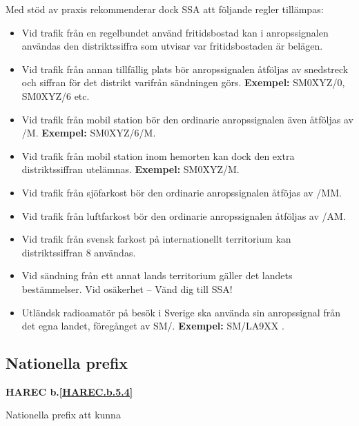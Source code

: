 Med stöd av praxis rekommenderar dock SSA att följande regler tillämpas:

\begin{itemize}
\item Vid trafik från en regelbundet använd fritidsbostad kan i
  anropssignalen användas den distriktssiffra som utvisar var
  fritidsbostaden är belägen.

\item Vid trafik från annan tillfällig plats bör anropssignalen
  åtföljas av snedstreck och siffran för det distrikt varifrån
  sändningen görs.
  \textbf{Exempel:} SM0XYZ/0, SM0XYZ/6 etc.

\item Vid trafik från mobil station bör den ordinarie anropssignalen
  även åtföljas av /M.
  \textbf{Exempel:} SM0XYZ/6/M.

\item Vid trafik från mobil station inom hemorten kan dock den extra
  distriktssiffran utelämnas.
  \textbf{Exempel:} SM0XYZ/M.

\item Vid trafik från sjöfarkost bör den ordinarie anropssignalen
 åtföjas av /MM.

\item Vid trafik från luftfarkost bör den ordinarie anropssignalen
  åtföljas av /AM.

\item Vid trafik från svensk farkost på internationellt territorium
 kan distriktssiffran 8 användas.

\item Vid sändning från ett annat lands territorium gäller det landets
  bestämmelser.
  Vid osäkerhet -- Vänd dig till SSA!

\item Utländsk radioamatör på besök i Sverige ska använda sin
  anropssignal från det egna landet, föregånget av SM/. \textbf{Exempel:} SM/LA9XX \cite{TR6101}.
\end{itemize}

\subsection{Nationella prefix}
\textbf{HAREC
	b.\ref{HAREC.b.5.4}\label{myHAREC.b.5.4}
}

Nationella prefix att kunna

